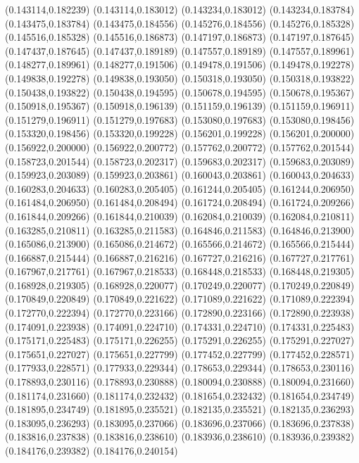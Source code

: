 (0.143114,0.182239)
(0.143114,0.183012)
(0.143234,0.183012)
(0.143234,0.183784)
(0.143475,0.183784)
(0.143475,0.184556)
(0.145276,0.184556)
(0.145276,0.185328)
(0.145516,0.185328)
(0.145516,0.186873)
(0.147197,0.186873)
(0.147197,0.187645)
(0.147437,0.187645)
(0.147437,0.189189)
(0.147557,0.189189)
(0.147557,0.189961)
(0.148277,0.189961)
(0.148277,0.191506)
(0.149478,0.191506)
(0.149478,0.192278)
(0.149838,0.192278)
(0.149838,0.193050)
(0.150318,0.193050)
(0.150318,0.193822)
(0.150438,0.193822)
(0.150438,0.194595)
(0.150678,0.194595)
(0.150678,0.195367)
(0.150918,0.195367)
(0.150918,0.196139)
(0.151159,0.196139)
(0.151159,0.196911)
(0.151279,0.196911)
(0.151279,0.197683)
(0.153080,0.197683)
(0.153080,0.198456)
(0.153320,0.198456)
(0.153320,0.199228)
(0.156201,0.199228)
(0.156201,0.200000)
(0.156922,0.200000)
(0.156922,0.200772)
(0.157762,0.200772)
(0.157762,0.201544)
(0.158723,0.201544)
(0.158723,0.202317)
(0.159683,0.202317)
(0.159683,0.203089)
(0.159923,0.203089)
(0.159923,0.203861)
(0.160043,0.203861)
(0.160043,0.204633)
(0.160283,0.204633)
(0.160283,0.205405)
(0.161244,0.205405)
(0.161244,0.206950)
(0.161484,0.206950)
(0.161484,0.208494)
(0.161724,0.208494)
(0.161724,0.209266)
(0.161844,0.209266)
(0.161844,0.210039)
(0.162084,0.210039)
(0.162084,0.210811)
(0.163285,0.210811)
(0.163285,0.211583)
(0.164846,0.211583)
(0.164846,0.213900)
(0.165086,0.213900)
(0.165086,0.214672)
(0.165566,0.214672)
(0.165566,0.215444)
(0.166887,0.215444)
(0.166887,0.216216)
(0.167727,0.216216)
(0.167727,0.217761)
(0.167967,0.217761)
(0.167967,0.218533)
(0.168448,0.218533)
(0.168448,0.219305)
(0.168928,0.219305)
(0.168928,0.220077)
(0.170249,0.220077)
(0.170249,0.220849)
(0.170849,0.220849)
(0.170849,0.221622)
(0.171089,0.221622)
(0.171089,0.222394)
(0.172770,0.222394)
(0.172770,0.223166)
(0.172890,0.223166)
(0.172890,0.223938)
(0.174091,0.223938)
(0.174091,0.224710)
(0.174331,0.224710)
(0.174331,0.225483)
(0.175171,0.225483)
(0.175171,0.226255)
(0.175291,0.226255)
(0.175291,0.227027)
(0.175651,0.227027)
(0.175651,0.227799)
(0.177452,0.227799)
(0.177452,0.228571)
(0.177933,0.228571)
(0.177933,0.229344)
(0.178653,0.229344)
(0.178653,0.230116)
(0.178893,0.230116)
(0.178893,0.230888)
(0.180094,0.230888)
(0.180094,0.231660)
(0.181174,0.231660)
(0.181174,0.232432)
(0.181654,0.232432)
(0.181654,0.234749)
(0.181895,0.234749)
(0.181895,0.235521)
(0.182135,0.235521)
(0.182135,0.236293)
(0.183095,0.236293)
(0.183095,0.237066)
(0.183696,0.237066)
(0.183696,0.237838)
(0.183816,0.237838)
(0.183816,0.238610)
(0.183936,0.238610)
(0.183936,0.239382)
(0.184176,0.239382)
(0.184176,0.240154)
